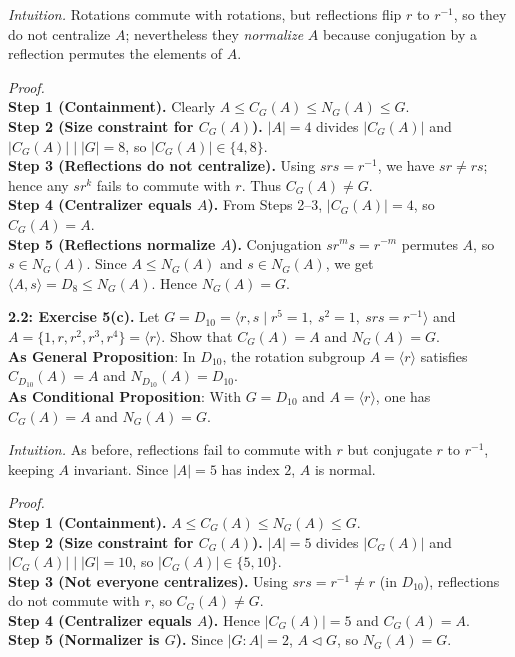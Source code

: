 \documentclass[12pt]{article}
\theoremstyle{definition}
\begin{document}
\newpage

\dotfill

\emph{Intuition.} Rotations commute with rotations, but reflections flip $r$ to $r^{-1}$, so they do not centralize $A$; nevertheless they \emph{normalize} $A$ because conjugation by a reflection permutes the elements of $A$.\\

\dotfill

\emph{Proof.}\\
\textbf{Step 1 (Containment).} Clearly $A\le C_G(A)\le N_G(A)\le G$.\\
\textbf{Step 2 (Size constraint for $C_G(A)$).} $|A|=4$ divides $|C_G(A)|$ and $|C_G(A)|\mid |G|=8$, so $|C_G(A)|\in\{4,8\}$.\\
\textbf{Step 3 (Reflections do not centralize).} Using $srs=r^{-1}$, we have $sr\neq rs$; hence any $sr^k$ fails to commute with $r$. Thus $C_G(A)\neq G$.\\
\textbf{Step 4 (Centralizer equals $A$).} From Steps 2–3, $|C_G(A)|=4$, so $C_G(A)=A$.\\
\textbf{Step 5 (Reflections normalize $A$).} Conjugation $s r^m s=r^{-m}$ permutes $A$, so $s\in N_G(A)$. Since $A\le N_G(A)$ and $s\in N_G(A)$, we get $\langle A,s\rangle=D_8\le N_G(A)$. Hence $N_G(A)=G$.\\

\newpage



\noindent \textbf{2.2: Exercise 5(c).} Let $G=D_{10}=\langle r,s\mid r^5=1,\ s^2=1,\ srs=r^{-1}\rangle$ and $A=\{1,r,r^2,r^3,r^4\}=\langle r\rangle$. Show that $C_G(A)=A$ and $N_G(A)=G$.\\ %

\noindent\textbf{As General Proposition}: In $D_{10}$, the rotation subgroup $A=\langle r\rangle$ satisfies $C_{D_{10}}(A)=A$ and $N_{D_{10}}(A)=D_{10}$.\\

\noindent \textbf{As Conditional Proposition}: With $G=D_{10}$ and $A=\langle r\rangle$, one has $C_G(A)=A$ and $N_G(A)=G$.

\newpage

\dotfill

\emph{Intuition.} As before, reflections fail to commute with $r$ but conjugate $r$ to $r^{-1}$, keeping $A$ invariant. Since $|A|=5$ has index $2$, $A$ is normal.\\

\dotfill

\emph{Proof.}\\
\textbf{Step 1 (Containment).} $A\le C_G(A)\le N_G(A)\le G$.\\
\textbf{Step 2 (Size constraint for $C_G(A)$).} $|A|=5$ divides $|C_G(A)|$ and $|C_G(A)|\mid |G|=10$, so $|C_G(A)|\in\{5,10\}$.\\
\textbf{Step 3 (Not everyone centralizes).} Using $srs=r^{-1}\neq r$ (in $D_{10}$), reflections do not commute with $r$, so $C_G(A)\neq G$.\\
\textbf{Step 4 (Centralizer equals $A$).} Hence $|C_G(A)|=5$ and $C_G(A)=A$.\\
\textbf{Step 5 (Normalizer is $G$).} Since $|G:A|=2$, $A\lhd G$, so $N_G(A)=G$.\\
\end{document}
